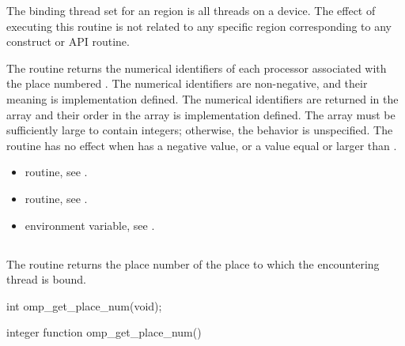 \binding
The binding thread set for an  region is all 
threads on a device. The effect of executing this routine is not related to 
any specific region corresponding to any construct or API routine.

\effect
The  routine returns the numerical 
identifiers of each processor associated with the place numbered 
. The numerical identifiers are non-negative, and 
their meaning is implementation defined.  The numerical identifiers 
are returned in the array  and their order in the array is 
implementation defined. The array must be sufficiently large to contain 
\code{)} integers; 
otherwise, the behavior is unspecified.  The routine has no effect when 
 has a negative value, or a value equal or larger 
than .

\crossreferences
\begin{itemize}
\item {} routine, see 
.

\item {} routine, see 
.

\item {} environment variable, see 
.
\end{itemize}




\subsection{}
\label{subsec:omp_get_place_num}

\summary
The  routine returns the place number of the place to which the encountering thread is bound.

\format
\begin{ccppspecific}
\begin{boxedcode}
int omp\_get\_place\_num(void);
\end{boxedcode}
\end{ccppspecific}

\begin{fortranspecific}
\begin{boxedcode}
integer function omp\_get\_place\_num()
\end{boxedcode}
\end{fortranspecific}

